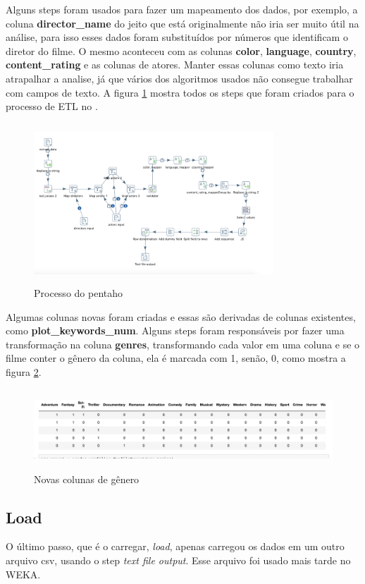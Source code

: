 Alguns steps foram usados para fazer um mapeamento dos dados, por exemplo, a coluna \textbf{director\_name} do jeito que está originalmente não iria ser muito útil na análise, para isso esses dados foram substituídos por números que identificam o diretor do filme. O mesmo aconteceu com as colunas \textbf{color}, \textbf{language}, \textbf{country}, \textbf{content\_rating} e as colunas de atores. Manter essas colunas como texto iria atrapalhar a analise, já que vários dos algoritmos usados não consegue trabalhar com campos de texto. A figura \ref{pentahoTransformation} mostra todos os steps que foram criados para o processo de ETL no \pdi.

\begin{figure}[H]
\centering
\includegraphics[height=6cm, width=9cm]{imagens/transformacao.png}
\caption{Processo do pentaho}
\label{pentahoTransformation}
\end{figure}

Algumas colunas novas foram criadas e essas são derivadas de colunas existentes, como \textbf{plot\_keywords\_num}. Alguns steps foram responsáveis por fazer uma transformação na coluna \textbf{genres}, transformando cada valor em uma coluna e se o filme conter o gênero da coluna, ela é marcada com 1, senão, 0, como mostra a figura \ref{newcolumns}.

\begin{figure}[H]
\centering
\includegraphics[height=3cm]{imagens/genres.png}
\caption{Novas colunas de gênero}
\label{newcolumns}
\end{figure}

\subsection{Load}
O último passo, que é o carregar, \textit{load}, apenas carregou os dados em um outro arquivo csv, usando o step \textit{text file output}. Esse arquivo foi usado mais tarde no WEKA.

